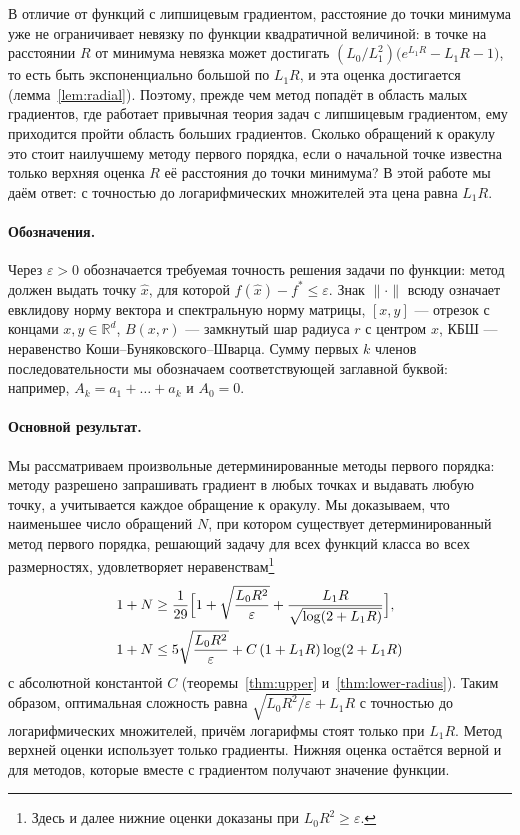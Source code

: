 \documentclass[11pt,a4paper]{article}
\newcommand{\R}{\mathbb R}
\newcommand{\norm}[1]{\|#1\|}
\begin{document}
В отличие от функций с липшицевым градиентом, расстояние до точки минимума уже не ограничивает невязку по функции квадратичной величиной: в точке на расстоянии $R$ от минимума невязка может достигать $(L_0/L_1^2)\bigl(e^{L_1R}-L_1R-1\bigr)$, то есть быть экспоненциально большой по $L_1R$, и эта оценка достигается (лемма~\ref{lem:radial}). Поэтому, прежде чем метод попадёт в область малых градиентов, где работает привычная теория задач с липшицевым градиентом, ему приходится пройти область больших градиентов. Сколько обращений к оракулу это стоит наилучшему методу первого порядка, если о начальной точке известна только верхняя оценка $R$ её расстояния до точки минимума? В этой работе мы даём ответ: с точностью до логарифмических множителей эта цена равна $L_1R$.

\paragraph{Обозначения.} Через $\varepsilon>0$ обозначается требуемая точность решения задачи по функции: метод должен выдать точку $\hat x$, для которой $f(\hat x)-f^\ast\le\varepsilon$. Знак $\norm{\cdot}$ всюду означает евклидову норму вектора и спектральную норму матрицы, $[x,y]$ --- отрезок с концами $x,y\in\R^d$, $B(x,r)$ --- замкнутый шар радиуса $r$ с центром $x$, КБШ --- неравенство Коши--Буняковского--Шварца. Сумму первых $k$ членов последовательности мы обозначаем соответствующей заглавной буквой: например, $A_k=a_1+\dots+a_k$ и $A_0=0$.

\paragraph{Основной результат.} Мы рассматриваем произвольные детерминированные методы первого порядка: методу разрешено запрашивать градиент в любых точках и выдавать любую точку, а учитывается каждое обращение к оракулу. Мы доказываем, что наименьшее число обращений $N$, при котором существует детерминированный метод первого порядка, решающий задачу для всех функций класса во всех размерностях, удовлетворяет неравенствам\footnote{Здесь и далее нижние оценки доказаны при $L_0R^2\ge\varepsilon$.}
\begin{align*}
 1+N&\ge\frac1{29}\Bigl[1+\sqrt{\frac{L_0R^2}{\varepsilon}}+\frac{L_1R}{\sqrt{\log(2+L_1R)}}\Bigr],\\
 1+N&\le5\sqrt{\frac{L_0R^2}{\varepsilon}}+C\,(1+L_1R)\log(2+L_1R)
\end{align*}
с абсолютной константой $C$ (теоремы~\ref{thm:upper} и~\ref{thm:lower-radius}). Таким образом, оптимальная сложность равна $\sqrt{L_0R^2/\varepsilon}+L_1R$ с точностью до логарифмических множителей, причём логарифмы стоят только при $L_1R$. Метод верхней оценки использует только градиенты. Нижняя оценка остаётся верной и для методов, которые вместе с градиентом получают значение функции.
\end{document}
